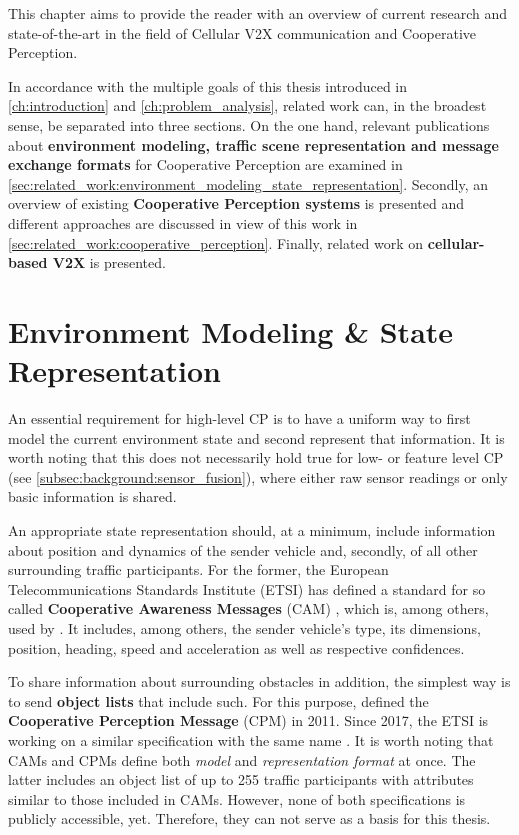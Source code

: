 This chapter aims to provide the reader with an overview of current research and state-of-the-art in the field of Cellular V2X communication and Cooperative Perception.
\par
\bigskip

In accordance with the multiple goals of this thesis introduced in \autoref{ch:introduction} and \autoref{ch:problem_analysis}, related work can, in the broadest sense, be separated into three sections. On the one hand, relevant publications about \textbf{environment modeling, traffic scene representation and message exchange formats} for Cooperative Perception are examined in \autoref{sec:related_work:environment_modeling_state_representation}. Secondly, an overview of existing \textbf{Cooperative Perception systems} is presented and different approaches are discussed in view of this work in \autoref{sec:related_work:cooperative_perception}. Finally, related work on \textbf{cellular-based V2X} is presented.

\section{Environment Modeling \& State Representation}
\label{sec:related_work:environment_modeling_state_representation}
An essential requirement for high-level CP is to have a uniform way to first model the current environment state and second represent that information. It is worth noting that this does not necessarily hold true for low- or feature level CP (see \autoref{subsec:background:sensor_fusion}), where either raw sensor readings or only basic information is shared.

An appropriate state representation should, at a minimum, include information about position and dynamics of the sender vehicle and, secondly, of all other surrounding traffic participants. For the former, the European Telecommunications Standards Institute (ETSI) has defined a standard for so called \textbf{Cooperative Awareness Messages} (CAM) \cite{EuropeanTelecommunicationsStandardsInstituteETSI2011}, which is, among others, used by \cite{Rauch2011}. It includes, among others, the sender vehicle's type, its dimensions, position, heading, speed and acceleration as well as respective confidences.

To share information about surrounding obstacles in addition, the simplest way is to send \textbf{object lists} that include such. For this purpose, \cite{Rauch2011} defined the \textbf{Cooperative Perception Message} (CPM) in 2011. Since 2017, the ETSI is working on a similar specification with the same name \cite{EuropeanTelecommunicationsStandardsInstituteETSI2019}. It is worth noting that CAMs and CPMs define both \textit{model} and \textit{representation format} at once. The latter includes an object list of up to 255 traffic participants \cite{Thandavarayan2019} with attributes similar to those included in CAMs. However, none of both specifications is publicly accessible, yet. Therefore, they can not serve as a basis for this thesis.

